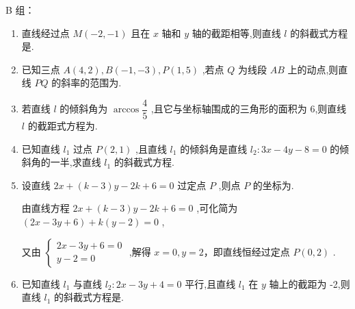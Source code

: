 B 组：
\begin{enumerate}
    \item 直线经过点 $M\left( {-2, - 1}\right)$ 且在 $x$ 轴和 $y$ 轴的截距相等,则直线 $l$ 的斜截式方程是.
    \begin{jieda}
    \end{jieda}

    \item 已知三点 $A\left( {4,2}\right) ,B\left( {-1, - 3}\right) ,P\left( {1,5}\right)$ ,若点 $Q$ 为线段 ${AB}$ 上的动点,则直线 ${PQ}$ 的斜率的范围为\blkda[4]{$(-\infty, -1] \cup [4, +\infty)$}.

    \item 若直线 $l$ 的倾斜角为 $\arccos \dfrac{4}{5}$ ,且它与坐标轴围成的三角形的面积为 6,则直线 $l$ 的截距式方程为.

    \item 已知直线 ${l}_{1}$ 过点 $P\left( {2,1}\right)$ ,且直线 ${l}_{1}$ 的倾斜角是直线 ${l}_{2} : {3x} - {4y} - 8 = 0$ 的倾斜角的一半,求直线 ${l}_{1}$ 的斜截式方程.

    \item 设直线 ${2x} + \left( {k - 3}\right) y - {2k} + 6 = 0$ 过定点 $P$ ,则点 $P$ 的坐标为.
    \begin{jieda}
        由直线方程 ${2x} + \left( {k - 3}\right) y - {2k} + 6 = 0$ ,可化简为 $\left( {{2x} - {3y} + 6}\right)  + k\left( {y - 2}\right)  = 0$ ,

        又由 $\left\{  \begin{array}{l} {2x} - {3y} + 6 = 0 \\  y - 2 = 0 \end{array}\right.$ ,解得 $x = 0,y = 2$，即直线恒经过定点 $P\left( {0,2}\right)$ .
    \end{jieda}

    \item 已知直线 ${l}_{1}$ 与直线 ${l}_{2} : {2x} - {3y} + 4 = 0$ 平行,且直线 ${l}_{1}$ 在 $y$ 轴上的截距为 -2,则直线 ${l}_{1}$ 的斜截式方程是.
    

\end{enumerate}
